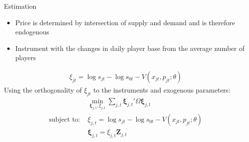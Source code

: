 \documentclass[bigger]{beamer}
\begin{document}
\begin{frame}[label={sec:orgcfd5afa}]{Estimation}
\begin{itemize}
\item Price is determined by intersection of supply and demand and is
therefore endogenous
\item Instrument with the changes in daily player base from the average
number of players
\end{itemize}

\begin{align*}
  \xi_{jt} = \log s_{jt} - \log s_{0t} - V( x_{jt}, p_{jt}; \theta)
\end{align*}
Using the orthogonality of \(\xi_{jt}\) to the instruments and exogenous
parameters:
\begin{align*}
  &\min_{\bm{\xi}_{j,t}, \xi_{j,t}} \sum_{j,t}\bm{\xi}_{j,t}' \Omega \bm{\xi}_{j,t}\\
  \text{subject to: } &\xi_{j,t} = \log s_{jt} - \log s_{0t} - V( x_{jt}, p_{jt}; \theta)\\
  &\bm{\xi}_{j,t} = \xi_{j,t} \bm{Z}_{j,t}  
\end{align*}
\end{frame}
\end{document}
